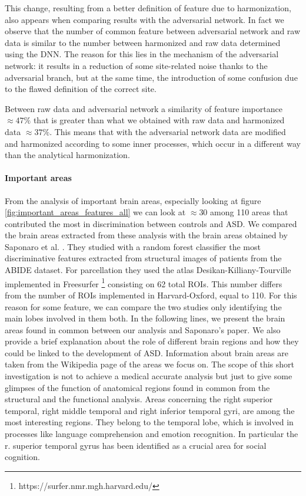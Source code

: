 \documentclass[11pt]{report}
\begin{document}
This change, resulting from a better definition of feature due to harmonization, also appears when comparing results with the adversarial network.
In fact we observe that the number of common feature between adversarial network and raw data is similar to the number between harmonized and raw data determined using the DNN.
The reason for this lies in the mechanism of the adversarial network: it results in a reduction of some site-related noise thanks to the adversarial branch, but at the same time, the introduction of some confusion due to the flawed definition of the correct site.

Between raw data and adversarial network a similarity of feature importance $\approx 47\%$ that is greater than what we obtained with raw data and harmonized data $\approx 37\%$.
This means that with the adversarial network data are modified and harmonized according to some inner processes, which occur in a different way than the analytical harmonization.

\paragraph{Important areas} \hfill

From the analysis of important brain areas, especially looking at figure \ref{fig:important_areas_features_all} we can look at $\approx 30$ among 110 areas that contributed the most in discrimination between controls and ASD.
We compared the brain areas extracted from these analysis with the brain areas obtained by Saponaro et al. \cite{saponaro2022}.
They studied with a random forest classifier the most discriminative features extracted from structural images of patients from the ABIDE dataset.
For parcellation they used the atlas Desikan-Killiany-Tourville implemented in Freesurfer \footnote{https://surfer.nmr.mgh.harvard.edu/} consisting on 62 total ROIs.
This number differs from the number of ROIs implemented in Harvard-Oxford, equal to 110.
For this reason for some feature, we can compare the two studies only identifying the main lobes involved in them both.
In the following lines, we present the brain areas found in common between our analysis and Saponaro's paper. 
We also provide a brief explanation about the role of different brain regions and how they could be linked to the development of ASD.
Information about brain areas are taken from the Wikipedia page of the areas we focus on.
The scope of this short investigation is not to achieve a medical accurate analysis but just to give some glimpses of the function of anatomical regions found in common from the structural and the functional analysis.
Areas concerning the right superior temporal, right middle temporal and right inferior temporal gyri, are among the most interesting regions.
They belong to the temporal lobe, which is involved in processes like language comprehension and emotion recognition.
In particular the r. superior temporal gyrus has been identified as a crucial area for social cognition.
\end{document}
